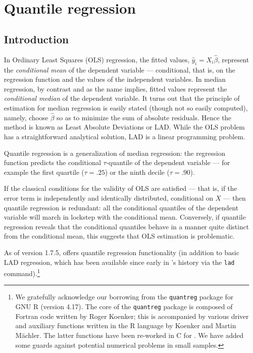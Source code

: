 \chapter{Quantile regression}
\label{chap:quantreg}

\section{Introduction}
\label{sec:rq-intro}

In Ordinary Least Squares (OLS) regression, the fitted values,
$\hat{y}_i = X_i\hat{\beta}$, represent the \emph{conditional mean} of
the dependent variable --- conditional, that is, on the regression
function and the values of the independent variables.  In median
regression, by contrast and as the name implies, fitted values
represent the \emph{conditional median} of the dependent variable.  It
turns out that the principle of estimation for median regression is
easily stated (though not so easily computed), namely, choose
$\hat{\beta}$ so as to minimize the sum of absolute residuals.  Hence
the method is known as Least Absolute Deviations or LAD.  While the OLS
problem has a straightforward analytical solution, LAD is a linear
programming problem.

Quantile regression is a generalization of median regression: the
regression function predicts the conditional $\tau$-quantile of the
dependent variable --- for example the first quartile ($\tau = .25$)
or the ninth decile ($\tau = .90$).

If the classical conditions for the validity of OLS are satisfied ---
that is, if the error term is independently and identically
distributed, conditional on $X$ --- then quantile regression is
redundant: all the conditional quantiles of the dependent variable
will march in lockstep with the conditional mean.  Conversely, if
quantile regression reveals that the conditional quantiles behave in a
manner quite distinct from the conditional mean, this suggests that
OLS estimation is problematic.

As of version 1.7.5,  offers quantile regression
functionality (in addition to basic LAD regression, which has been
available since early in 's history via the \texttt{lad}
command).\footnote{We gratefully acknowledge our borrowing from the
  \texttt{quantreg} package for GNU \textsf{R} (version 4.17).  The
  core of the \texttt{quantreg} package is composed of Fortran code
  written by Roger Koenker; this is accompanied by various driver and
  auxiliary functions written in the \textsf{R} language by Koenker
  and Martin M\"achler.  The latter functions have been re-worked in C
  for .  We have added some guards against potential
  numerical problems in small samples.}

